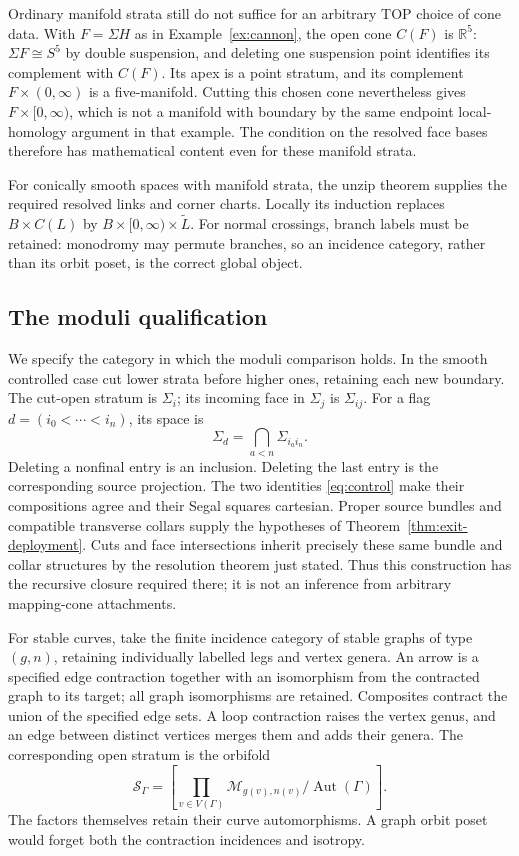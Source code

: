 \documentclass[11pt,a4paper]{article}
\theoremstyle{definition}
\newcommand{\R}{\mathbb R}
\begin{document}
Ordinary manifold strata still do not suffice for an arbitrary TOP
choice of cone data. With $F=\Sigma H$ as in
Example~\ref{ex:cannon}, the open cone $C(F)$ is $\R^5$:
$\Sigma F\cong S^5$ by double suspension, and deleting one suspension
point identifies its complement with $C(F)$. Its apex is a point
stratum, and its complement $F\times(0,\infty)$ is a five-manifold.
Cutting this chosen cone nevertheless gives $F\times[0,\infty)$,
which is not a manifold with boundary by the same endpoint local-homology
argument in that example. The condition on the resolved face bases
therefore has mathematical content even for these manifold strata.

For conically smooth spaces with manifold strata, the unzip theorem
\cite[Theorem~7.3.8]{AFT} supplies the required resolved links and
corner charts. Locally its induction replaces $B\times C(L)$ by
$B\times[0,\infty)\times\widetilde L$. For normal crossings, branch
labels must be retained: monodromy may permute branches, so an incidence
category, rather than its orbit poset, is the correct global object.

\subsection{The moduli qualification}\label{sec:orbifold-exit}
We specify the category in which the moduli comparison holds. In the
smooth controlled case cut lower strata before higher ones, retaining
each new boundary. The cut-open stratum is $\Sigma_i$; its incoming
face in $\Sigma_j$ is $\Sigma_{ij}$. For a flag
$d=(i_0<\cdots<i_n)$, its space is
\[
 \Sigma_d=\bigcap_{a<n}\Sigma_{i_ai_n}.
\]
Deleting a nonfinal entry is an inclusion. Deleting the last entry is
the corresponding source projection. The two identities
\eqref{eq:control} make their compositions agree and their Segal
squares cartesian. Proper source bundles and compatible transverse
collars supply the hypotheses of Theorem~\ref{thm:exit-deployment}.
Cuts and face intersections inherit precisely these same bundle and
collar structures by the resolution theorem just stated. Thus this
construction has the recursive closure required there; it is not an
inference from arbitrary mapping-cone attachments.

For stable curves, take the finite incidence category of stable graphs
of type $(g,n)$, retaining individually labelled legs and vertex genera.
An arrow is a specified edge contraction together with an isomorphism
from the contracted graph to its target; all graph isomorphisms are
retained. Composites contract the union of the specified edge sets.
A loop contraction raises the vertex genus, and an edge between distinct
vertices merges them and adds their genera. The corresponding open
stratum is the orbifold
\[
 \mathcal S_\Gamma=
 \left[\prod_{v\in V(\Gamma)}\mathcal M_{g(v),n(v)}
       /\operatorname{Aut}(\Gamma)\right].
\]
The factors themselves retain their curve automorphisms. A graph
orbit poset would forget both the contraction incidences and isotropy.
\end{document}
